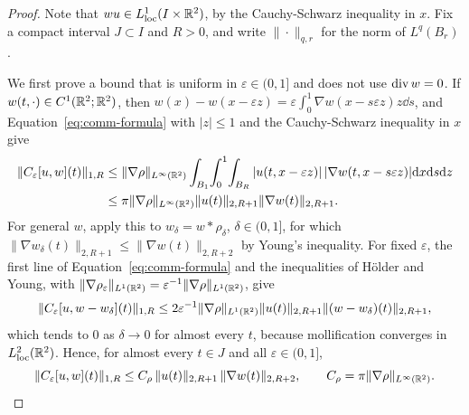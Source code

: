 \begin{proof}
Note that $wu\in L^1_{\mathrm{loc}}(I\times\mathbb{R}^2)$, by the Cauchy-Schwarz
inequality in $x$. Fix a compact interval
$J\subset I$ and $R>0$, and write $\|\cdot\|_{q,r}$ for the norm of $L^q(B_r)$.

We first prove a bound that is uniform in $\varepsilon\in(0,1]$ and does not use
$\operatorname{div} w=0$. If $w(t,\cdot)\in C^1(\mathbb{R}^2;\mathbb{R}^2)$, then
$w(x)-w(x-\varepsilon z)=\varepsilon\int_0^1\nabla w(x-s\varepsilon z)z\dd s$,
and Equation~\eqref{eq:comm-formula} with $|z|\le1$ and the Cauchy-Schwarz
inequality in $x$ give
\begin{align*}
\|C_\varepsilon[u,w](t)\|_{1,R}
&\le\|\nabla\rho\|_{L^\infty(\mathbb{R}^2)}\int_{B_1}\!\int_0^1\!\int_{B_R}
|u(t,x-\varepsilon z)|\,|\nabla w(t,x-s\varepsilon z)|\dd x\dd s\dd z\\
&\le\pi\|\nabla\rho\|_{L^\infty(\mathbb{R}^2)}\|u(t)\|_{2,R+1}\|\nabla w(t)\|_{2,R+1}.
\end{align*}
For general $w$, apply this to $w_\delta=w\ast\rho_\delta$, $\delta\in(0,1]$,
for which $\|\nabla w_\delta(t)\|_{2,R+1}\le\|\nabla w(t)\|_{2,R+2}$ by Young's
inequality. For fixed $\varepsilon$, the first line of
Equation~\eqref{eq:comm-formula} and the inequalities of H\"older and Young,
with $\|\nabla\rho_\varepsilon\|_{L^1(\mathbb{R}^2)}=\varepsilon^{-1}\|\nabla\rho\|_{L^1(\mathbb{R}^2)}$,
give
\[
\|C_\varepsilon[u,w-w_\delta](t)\|_{1,R}\le2\varepsilon^{-1}\|\nabla\rho\|_{L^1(\mathbb{R}^2)}
\|u(t)\|_{2,R+1}\|(w-w_\delta)(t)\|_{2,R+1},
\]
which tends to $0$ as
$\delta\to0$ for almost every $t$, because mollification converges in
$L^2_{\mathrm{loc}}(\mathbb{R}^2)$. Hence, for almost every $t\in J$ and all
$\varepsilon\in(0,1]$,
\begin{equation}
\label{eq:comm-bound}
\|C_\varepsilon[u,w](t)\|_{1,R}\le C_\rho\,\|u(t)\|_{2,R+1}\,\|\nabla w(t)\|_{2,R+2},
\qquad C_\rho=\pi\|\nabla\rho\|_{L^\infty(\mathbb{R}^2)}.
\end{equation}


\end{proof}
